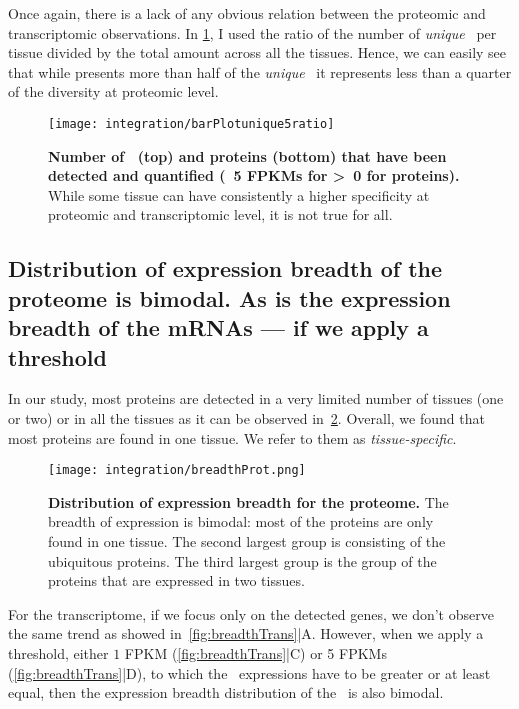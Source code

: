 Once again, there is a lack of any obvious relation between
the proteomic and transcriptomic observations.
In \cref{fig:barPlotunique5ratio}, I used the ratio of the number of \emph{unique}
\mRNAs\ per tissue divided by the total amount across all the tissues.
Hence, we can easily see that while  presents more than half of
the \emph{unique} \mRNAs\, it represents less than a quarter of the diversity
at proteomic level.

\begin{figure}[!htbp]
    \texttt{[image: integration/barPlotunique5ratio]}\centering
     \caption[Distribution of \mRNAs\ and proteins detected (at specific
     thresholds) only in one unique
     tissue]{\label{fig:barPlotunique5ratio}\textbf{Number of
     \mRNAs\ (top) and proteins (bottom)
     that have been detected and quantified (\geq\ 5 \glspl{FPKM} for \mRNA\;
     \textgreater\ 0 for proteins).} While some tissue can have
     consistently a higher
     specificity at proteomic and transcriptomic level, it is not true for all.}
\end{figure}


\subsection{Distribution of expression breadth of the proteome is bimodal. As is
the expression breadth of the mRNAs --- if we apply a threshold}%
\label{subsec:IntegrationProteinBimodalExpre}

In our study, most proteins are detected in a very limited number of tissues (one
or two) or in all the tissues as it can be observed in~\cref{fig:breadthProt}.
Overall, we found that most proteins are found in one tissue. We refer to them as
\emph{tissue-specific}.

\begin{figure}[!htbp]
    \texttt{[image: integration/breadthProt.png]}\centering
    \caption[Distribution of expression breadth for the proteome]
    {\label{fig:breadthProt}\textbf{Distribution of expression breadth for the
    proteome.} The breadth of expression is bimodal: most of the proteins are
    only found in one tissue. The second largest group is consisting of
    the ubiquitous proteins. The third largest group is the group of the proteins
    that are expressed in two tissues.}
\end{figure}


For the transcriptome, if we focus only on the detected genes, we don’t observe
the same trend as showed in~\cref{fig:breadthTrans}|A.
However, when we apply a threshold, either $1$ \gls{FPKM}
(\cref{fig:breadthTrans}|C) or
5 \glspl{FPKM} (\cref{fig:breadthTrans}|D), to which the \mRNA\ expressions
have to be greater or at least equal, then the expression breadth distribution
of the \mRNAs\ is also bimodal.

